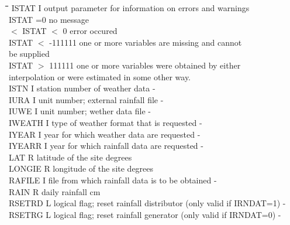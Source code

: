 \documentclass[11pt]{article}
\begin{document}
\nwln
\begin{tabbing}
\hspace{1.27cm}\=\hspace{1.27cm}\=\hspace{1.27cm}\=\hspace{1.27cm}\=%
\hspace{1.27cm}\=\hspace{1.27cm}\=\hspace{1.27cm}\=\hspace{1.27cm}\=%
\hspace{1.27cm}\=\hspace{1.27cm}\=\kill
ISTAT\> \> I\> output parameter for information on errors and warnings\\
\>\> \> ISTAT =0  no message\\
\>\>  $<$ ISTAT $<$ 0 error occured\\
\>\> \> ISTAT $<$ -111111 one or more variables are missing and cannot \\
\>\> \>         be supplied\\
\>\> \> ISTAT $>$ 111111 one or more variables were obtained by either \\
\>\> \>         interpolation or were estimated in some other way.\\
ISTN\> \> I\> station number of weather data\> \> \> \> \> \> \> -\\
IURA\> \> I\> unit number; external rainfall file\> \> \> \> \> \> \> -\\
IUWE\> \> I\> unit number; wether data file\> \> \> \> \> \> \> -\\
IWEATH\> \> I\> type of weather format that is requested\> \> \> \> \> \> \> -\\
IYEAR\> \> I\> year for which weather data are requested\> \> \> \> \> \> \> -\\
IYEARR\> \> I\> year for which rainfall data are requested\> \> \> \> \> \> \> -\\
LAT\> \> R\> latitude of the site\> \> \> \> \> \> \> degrees\\
LONGIE\> \> R\> longitude of the site\> \> \> \> \> \> \> degrees\\
RAFILE\> \> I\> file from which rainfall data is to be obtained\> \> \> \> \> \> \> -\\
RAIN\> \> R\> daily rainfall\> \> \> \> \> \> \> cm\\
RSETRD\> \> L\> logical flag; reset rainfall distributor (only valid if IRNDAT=1)\> \> \> \> \> \> \> -\\
RSETRG\> \> L\> logical flag; reset rainfall generator (only valid if IRNDAT=0)\> \> \> \> \> \> \> -\\

\end{tabbing}
\end{document}
